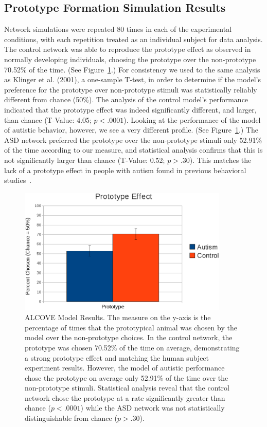 \subsection{Prototype Formation Simulation Results}

Network simulations were repeated 80 times in each of the experimental conditions, with each repetition treated as an individual subject for data analysis.  The control network was able to reproduce the prototype effect as observed in normally developing individuals, choosing the prototype over the non-prototype 70.52\% of the time.  (See Figure~\ref{alcove-results}.)  For consistency we used to the same analysis as Klinger et al. (2001), a one-sample T-test, in order to determine if the model's preference for the prototype over non-prototype stimuli was statistically reliably different from chance (50\%).  The analysis of the control model's performance indicated that the prototype effect was indeed significantly different, and larger, than chance (T-Value: 4.05; $p < .0001$).   Looking at the performance of the model of autistic behavior, however, we see a very different profile. (See Figure~\ref{alcove-results}.)  The ASD network preferred the prototype over the non-prototype stimuli only 52.91\% of the time according to our measure, and statistical analysis confirms that this is not significantly larger than chance (T-Value: 0.52; $p > .30$).  This matches the lack of a prototype effect in people with autism found in previous behavioral studies~\cite{RefWorks:113,StraussMS:2009:Prototype}.

\begin{figure}[ht]
\begin{center}
	\includegraphics[width=100mm]{graphs/alcove_results.eps}
\end{center}
\caption{ALCOVE Model Results.  The measure on the y-axis is the percentage of times that the prototypical animal was chosen by the model over the non-prototype choices.  In the control network, the prototype was chosen 70.52\% of the time on average, demonstrating a strong prototype effect and matching the human subject experiment results.  However, the model of autistic performance chose the prototype on average only 52.91\% of the time over the non-prototype stimuli.  Statistical analysis reveal that the control network chose the prototype at a rate significantly greater than chance ($p < .0001$) while the ASD network was not statistically distinguishable from chance ($p > .30$).}
\label{alcove-results}
\end{figure} 

